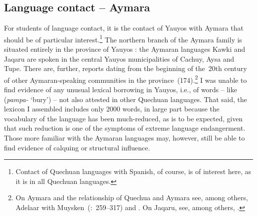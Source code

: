 \subsection{Language contact -- Aymara}
For students of language contact, it is the contact of Yauyos with Aymara that should be of particular interest.\footnote{Contact of Quechuan languages with Spanish, of course, is of interest here, as it is in all Quechuan languages.} The northern branch of the Aymara family is situated entirely in the province of Yauyos \citep[173]{Adelaar04}: the Aymaran languages Kawki and Jaqaru are spoken in the central Yauyos municipalities of Cachuy, Aysa and Tupe. There are, further, reports dating from the beginning of the~20th century of other Aymaran-speaking communities in the province~(174).\footnote{On Aymara and the relationship of Quechua and Aymara see, among others, Adelaar with Muysken~(\citeyear{Adelaar04}:~259--317) and \citet{CerroP94,CerroP00}. On Jaqaru, see, among others, \citet{Hardman66,Hardman83,Hardman00}.} I was unable to find evidence of any unusual lexical borrowing in Yauyos, i.e., of words -- like (\textit{pampa-} `bury') -- not also attested in other Quechuan languages. That said, the lexicon I assembled includes only 2000 words, in large part because the vocabulary of the language has been much-reduced, as is to be expected, given that such reduction is one of the symptoms of extreme language endangerment. Those more familiar with the Aymaran languages may, however, still be able to find evidence of calquing or structural influence.

